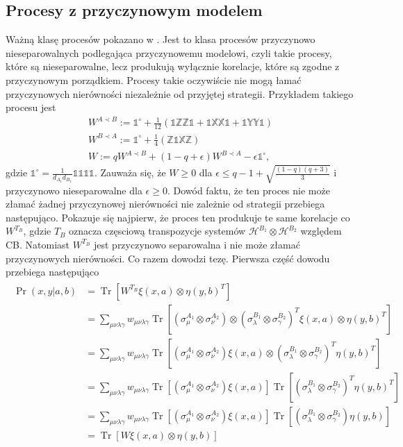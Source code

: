 \documentclass[10pt]{article} %
\DeclareMathOperator{\Trs}{Tr}
\newcommand{\Hx}[1]{\mathcal{H}^{#1}}
\newcommand{\X}{\mathbb{X}}
\newcommand{\Y}{\mathbb{Y}}
\newcommand{\Z}{\mathbb{Z}}
\newcommand{\I}{\mathbb{1}}
\newcommand{\IO}{\mathbb{1}^\circ}
\begin{document}
\subsection{Procesy z przyczynowym modelem}
Ważną klasę procesów pokazano w \cite{causal_model}. Jest to klasa procesów przyczynowo nieseparowalnych podlegająca przyczynowemu modelowi, czyli takie procesy, które są nieseparowalne, lecz produkują wyłącznie korelacje, które są zgodne z przyczynowym porządkiem. Procesy takie oczywiście nie mogą
łamać przyczynowych nierówności niezależnie od przyjętej strategii. Przykładem takiego procesu jest 
\begin{gather}
W^{A \prec B} := \IO + \frac{1}{12}(\I\Z\Z\I + \I\X\X\I + \I\Y\Y\I) \\
W^{B \prec A} := \IO + \frac{1}{4}(\Z\I\X\Z)\\
\label{eq:nsep_causal}
W := qW^{A \prec B} + (1-q+\epsilon)W^{B \prec A} -\epsilon\IO,
\end{gather} gdzie $\IO = \frac{1}{d_{A_1}d_{B_1}} \I\I\I\I$.
Zauważa się, że $W \geq 0$ dla $\epsilon \leq q- 1 + \sqrt{\frac{(1-q)(q+3)}{3}}$ i przyczynowo nieseparowalne dla $\epsilon \geq 0$. 
Dowód faktu, że ten proces nie może złamać żadnej przyczynowej nierówności nie zależnie od strategii przebiega następująco.
Pokazuje się najpierw, że proces ten produkuje te same korelacje co $W^{T_B}$, gdzie $T_B$ oznacza częsciową transpozycje systemów $\Hx{B_1} \otimes \Hx{B_2}$ względem CB. Natomiast $W^{T_B}$ jest przyczynowo separowalna i nie może złamać przyczynowych nierówności. Co razem dowodzi tezę. Pierwsza część dowodu przebiega następująco 
\begin{align}
\begin{split}
\Pr(x,y|a,b) &= \Trs\left[W^{T_B} \xi(x,a) \otimes \eta(y,b)^{T}\right] \\
	&= \sum_{\mu\nu\lambda\gamma} w_{\mu\nu\lambda\gamma} \Trs \left[ (\sigma_\mu^{A_1}\otimes\sigma_\nu^{A_2})\otimes(\sigma_\lambda^{B_1}\otimes\sigma_\gamma^{B_2})^T \xi(x,a) \otimes \eta(y,b)^{T} \right] \\
	&= \sum_{\mu\nu\lambda\gamma} w_{\mu\nu\lambda\gamma} \Trs \left[ (\sigma_\mu^{A_1}\otimes\sigma_\nu^{A_2}) \xi(x,a) \otimes (\sigma_\lambda^{B_1}\otimes\sigma_\gamma^{B_2})^T\eta(y,b)^{T} \right] \\
	&= \sum_{\mu\nu\lambda\gamma} w_{\mu\nu\lambda\gamma}  \Trs \left[ (\sigma_\mu^{A_1}\otimes\sigma_\nu^{A_2}) \xi(x,a)\right] \Trs \left[ (\sigma_\lambda^{B_1}\otimes\sigma_\gamma^{B_2})^T\eta(y,b)^{T} \right] \\
	&= \sum_{\mu\nu\lambda\gamma} w_{\mu\nu\lambda\gamma}  \Trs \left[ (\sigma_\mu^{A_1}\otimes\sigma_\nu^{A_2}) \xi(x,a)\right] \Trs \left[ (\sigma_\lambda^{B_1}\otimes\sigma_\gamma^{B_2})\eta(y,b) \right] \\
	&=  \Trs\left[W \xi(x,a) \otimes \eta(y,b)\right]
\end{split}
\end{align}
\end{document}
